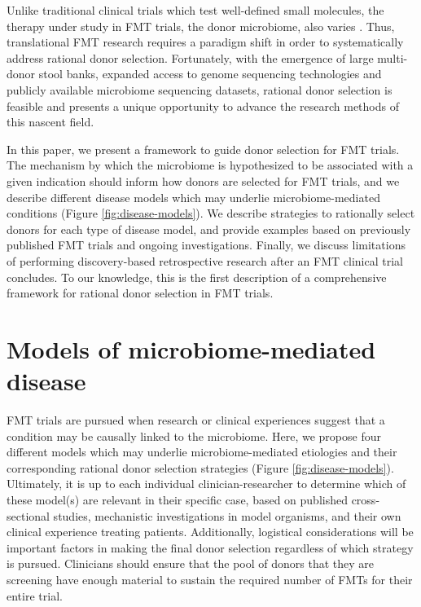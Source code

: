 Unlike traditional clinical trials which test well-defined small molecules, the therapy under study in FMT trials, the donor microbiome, also varies \cite{Olesen2018}.
Thus, translational FMT research requires a paradigm shift in order to systematically address rational donor selection.
Fortunately, with the emergence of large multi-donor stool banks, expanded access to genome sequencing technologies and publicly available microbiome sequencing datasets, rational donor selection is feasible and presents a unique opportunity to advance the research methods of this nascent field.

In this paper, we present a framework to guide donor selection for FMT trials.
The mechanism by which the microbiome is hypothesized to be associated with a given indication should inform how donors are selected for FMT trials, and we describe different disease models which may underlie microbiome-mediated conditions (Figure \ref{fig:disease-models}).
We describe strategies to rationally select donors for each type of disease model, and provide examples based on previously published FMT trials and ongoing investigations.
Finally, we discuss limitations of performing discovery-based retrospective research after an FMT clinical trial concludes.
To our knowledge, this is the first description of a comprehensive framework for rational donor selection in FMT trials.

\section{Models of microbiome-mediated disease}

FMT trials are pursued when research or clinical experiences suggest that a condition may be causally linked to the microbiome.
Here, we propose four different models which may underlie microbiome-mediated etiologies and their corresponding rational donor selection strategies (Figure \ref{fig:disease-models}).
Ultimately, it is up to each individual clinician-researcher to determine which of these model(s) are relevant in their specific case, based on published cross-sectional studies, mechanistic investigations in model organisms, and their own clinical experience treating patients.
Additionally, logistical considerations will be important factors in making the final donor selection regardless of which strategy is pursued.
Clinicians should ensure that the pool of donors that they are screening have enough material to sustain the required number of FMTs for their entire trial.


